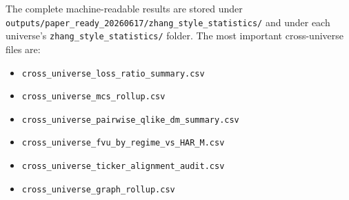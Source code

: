 \documentclass[11pt,a4paper]{article}
\begin{document}
The complete machine-readable results are stored under
\texttt{outputs/paper\_ready\_20260617/zhang\_style\_statistics/} and under each universe's
\texttt{zhang\_style\_statistics/} folder.  The most important cross-universe files are:
\begin{itemize}
\item \texttt{cross\_universe\_loss\_ratio\_summary.csv}
\item \texttt{cross\_universe\_mcs\_rollup.csv}
\item \texttt{cross\_universe\_pairwise\_qlike\_dm\_summary.csv}
\item \texttt{cross\_universe\_fvu\_by\_regime\_vs\_HAR\_M.csv}
\item \texttt{cross\_universe\_ticker\_alignment\_audit.csv}
\item \texttt{cross\_universe\_graph\_rollup.csv}
\end{itemize}
\end{document}
